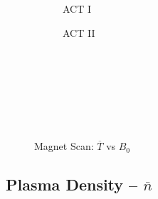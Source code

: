\begin{figure*}[h!]
\begin{subfigure}[t]{0.45\textwidth}
\begin{adjustbox}{width=\textwidth}
    \end{adjustbox}
        \caption{ACT I}
    \end{subfigure}
    \hfill
    \begin{subfigure}[t]{0.45\textwidth}
        \centering
    \begin{adjustbox}{width=\textwidth}
      \Large
      
    \end{adjustbox}
        \caption{ACT II}
    \end{subfigure}
    \hfill \hfill ~\\ ~\\ ~\\ ~\\
  \caption[]{Magnet Scan: $\overline T$ vs $B_0$} ~\\
\end{figure*}


\clearpage

\newpage

\subsection*{ Plasma Density -- $\overline n$ }
  \label{subsection:scan_n_bar}

